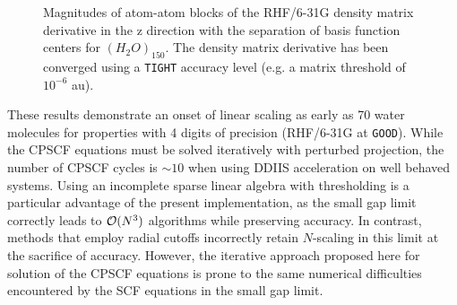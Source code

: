 \documentclass[prl,aps,twocolumn,showpacs,twocolumngrid,superbib]{revtex4}
\begin{document}
{\begin{figure}
  \caption{\protect
    Magnitudes of atom-atom blocks of the RHF/6-31G density matrix derivative
    in the z direction with the separation of basis function centers for $(H_2O)_{150}$.
    The density matrix derivative has been converged using a {\tt TIGHT} accuracy level (e.g. 
    a matrix threshold of $10^{-6}$ au).
  }\label{fig:DPrimeZ_150_6-31G}
\end{figure}
}

These results demonstrate an onset of linear scaling as early as 70 water molecules
for properties with 4 digits of precision (RHF/6-31G at {\tt GOOD}). 
While the CPSCF equations must be solved iteratively with perturbed projection,  
the number of CPSCF cycles is $\sim 10$ when using DDIIS acceleration on well behaved systems.
Using an incomplete sparse linear algebra with thresholding is a particular advantage of the 
present implementation, as the small gap limit correctly leads to ${\cal O}(N^3)$ 
algorithms while preserving accuracy.  In contrast, methods that employ radial cutoffs
incorrectly retain $N$-scaling in this limit at the sacrifice of accuracy. 
However, the iterative approach proposed here for solution of the CPSCF equations is prone to the same 
numerical difficulties encountered by the SCF equations in the small gap limit.
\end{document}

